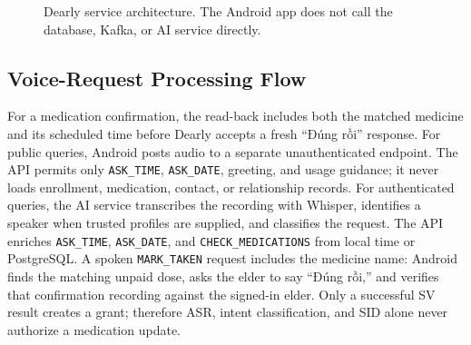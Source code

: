 \begin{figure}[H]
\centering
{}
\caption{Dearly service architecture. The Android app does not call the database, Kafka, or AI service directly.}
\label{fig:architecture}
\end{figure}

\subsection{Voice-Request Processing Flow}
For a medication confirmation, the read-back includes both the matched medicine and its scheduled time before Dearly accepts a fresh ``Đúng rồi'' response.
For public queries, Android posts audio to a separate unauthenticated endpoint. The API permits only \texttt{ASK\_TIME}, \texttt{ASK\_DATE}, greeting, and usage guidance; it never loads enrollment, medication, contact, or relationship records. For authenticated queries, the AI service transcribes the recording with Whisper, identifies a speaker when trusted profiles are supplied, and classifies the request. The API enriches \texttt{ASK\_TIME}, \texttt{ASK\_DATE}, and \texttt{CHECK\_MEDICATIONS} from local time or PostgreSQL. A spoken \texttt{MARK\_TAKEN} request includes the medicine name: Android finds the matching unpaid dose, asks the elder to say ``Đúng rồi,'' and verifies that confirmation recording against the signed-in elder. Only a successful SV result creates a grant; therefore ASR, intent classification, and SID alone never authorize a medication update.
